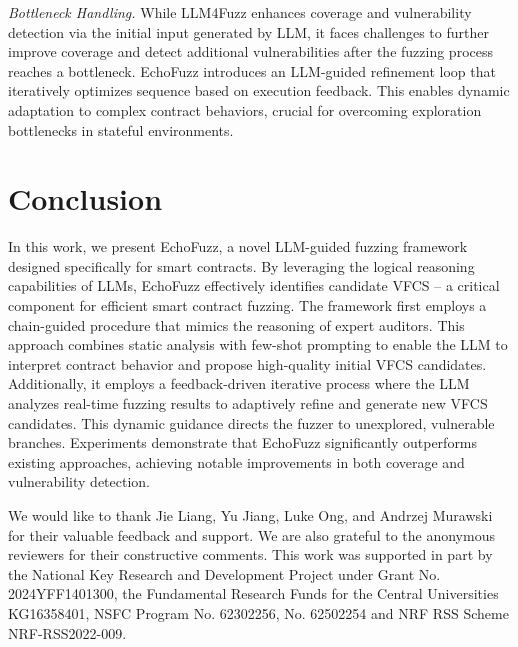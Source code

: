 \documentclass[sigconf]{acmart}
\newcommand{\ToolName}{\textcolor{ToolNameColor}{\textsf{{EchoFuzz}}}}
\begin{document}
\begin{sloppypar}
\textit{Bottleneck Handling.} \quad
%
While LLM4Fuzz enhances coverage and vulnerability detection via the initial input generated by LLM, it faces challenges to further improve coverage and detect additional vulnerabilities after the fuzzing process reaches a bottleneck. \ToolName{} introduces an LLM-guided refinement loop that iteratively optimizes sequence based on execution feedback. This enables dynamic adaptation to complex contract behaviors, crucial for overcoming exploration bottlenecks in stateful environments.


 
\section{Conclusion}
%

\label{sec:conclusion}

In this work, we present \ToolName, a novel LLM-guided fuzzing framework designed specifically for smart contracts. By leveraging the logical reasoning capabilities of LLMs, \ToolName{} effectively identifies candidate VFCS -- a critical component for efficient smart contract fuzzing. 
%
The framework first employs a chain-guided procedure that mimics the reasoning of expert auditors. 
This approach combines static analysis with few-shot prompting to enable the LLM to interpret contract behavior and propose high-quality initial VFCS candidates.
%
Additionally, it employs a feedback-driven iterative process where the LLM analyzes real-time fuzzing results to adaptively refine and generate new VFCS candidates.
This dynamic guidance directs the fuzzer to unexplored, vulnerable branches.
Experiments demonstrate that \ToolName{} significantly outperforms existing approaches, achieving notable improvements in both coverage and vulnerability detection.


%
\begin{acks}
We would like to thank Jie Liang, Yu Jiang, Luke Ong, and Andrzej Murawski for their valuable feedback and support. We are also grateful to the anonymous reviewers for their constructive comments.
This work was supported in part by the National Key Research and Development Project under Grant No. 2024YFF1401300, the Fundamental Research Funds for the Central Universities KG16358401, NSFC Program No. 62302256, No. 62502254 and NRF RSS Scheme NRF-RSS2022-009.
\end{acks}







\end{sloppypar}
\end{document}
